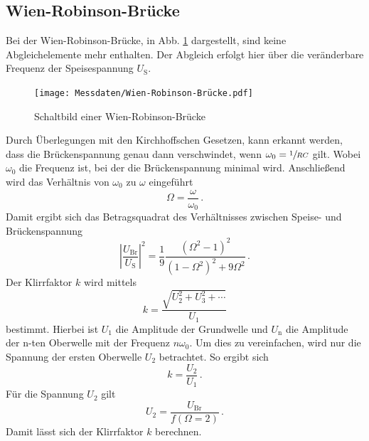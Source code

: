     \subsection{Wien-Robinson-Brücke}
    Bei der Wien-Robinson-Brücke, in Abb. \ref{fig:Wien_Robinson_Bruecke} dargestellt, sind keine Abgleichelemente mehr enthalten.
    Der Abgleich erfolgt hier über die veränderbare Frequenz der Speisespannung $U_\text{S}$.
    \begin{figure}
        \centering
        \texttt{[image: Messdaten/Wien-Robinson-Brücke.pdf]}
        \caption{Schaltbild einer Wien-Robinson-Brücke}
        \label{fig:Wien_Robinson_Bruecke}
    \end{figure}
    Durch Überlegungen mit den Kirchhoffschen Gesetzen, kann erkannt werden, dass die Brückenspannung genau dann verschwindet,
    wenn $\omega_0 = \sfrac{1}{RC}$ gilt.
    Wobei $\omega_0$ die Frequenz ist, bei der die Brückenspannung minimal wird.
    Anschließend wird das Verhältnis von $\omega_0$ zu $\omega$ eingeführt
    \begin{equation*}
        \Omega = \frac{\omega}{\omega_0}\, \text{.}
    \end{equation*}
    Damit ergibt sich das Betragsquadrat des Verhältnisses zwischen Speise- und Brückenspannung
    \begin{equation*}
        |\frac{U_\text{Br}}{U_\text{S}}|^2 = \frac{1}{9} \frac{(\Omega^2 - 1)^2}{(1 - \Omega^2)^2 + 9 \Omega^2} \, \text{.}
    \end{equation*}
    Der Klirrfaktor $k$ wird mittels
    \begin{equation}
        k = \frac{\sqrt {U_2^2 + U_3^2 + \dotsb}}{U_1}
    \end{equation}
    bestimmt.
    Hierbei ist $U_1$ die Amplitude der Grundwelle und $U_\text{n}$ die Amplitude der n-ten Oberwelle mit der Frequenz $n\omega_0$.
    Um dies zu vereinfachen, wird nur die Spannung der ersten Oberwelle $U_2$ betrachtet.
    So ergibt sich
    \begin{equation}
        k = \frac{U_2}{U_1} \, \text{.}
    \end{equation}
    Für die Spannung $U_2$ gilt
    \begin{equation}
        U_2 = \frac{U_\text{Br}}{f(\Omega = 2)} \, \text{.}
    \end{equation}
    Damit lässt sich der Klirrfaktor $k$ berechnen.